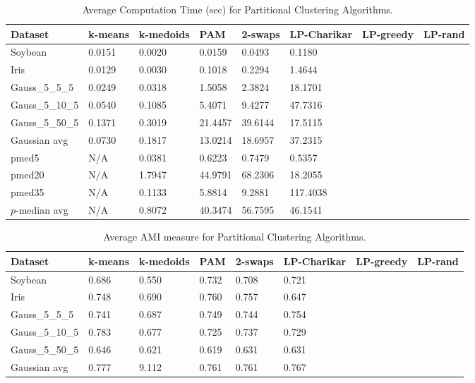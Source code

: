 \documentclass[conference, 10pt, final]{IEEEtran}
\begin{document}
\begin{table}[!t]
\label{fig:flat_results_comp}
\caption{Average Computation Time (sec) for Partitional Clustering Algorithms.}
\centering
\begin{tabular}{ | l | l | l | l | l | l | l | l|}
\hline
Dataset	&	k-means	&	k-medoids	&	PAM	&	2-swaps	&	LP-Charikar	&	LP-greedy	&	LP-rand	\\ \hline
Soybean	&	0.0151	&	0.0020	&	0.0159	&	0.0493	&	0.1180	&		&		\\
Iris	&	0.0129	&	0.0030	&	0.1018	&	0.2294	&	1.4644	&		&		\\
Gauss\_5\_5\_5	&	0.0249	&	0.0318	&	1.5058	&	2.3824	&	18.1701	&		&		\\
Gauss\_5\_10\_5	&	0.0540	&	0.1085	&	5.4071	&	9.4277	&	47.7316	&		&		\\
Gauss\_5\_50\_5	&	0.1371	&	0.3019	&	21.4457	&	39.6144	&	17.5115	&		&		\\
Gaussian avg	&	0.0730	&	0.1817	&	13.0214	&	18.6957	&	37.2315	&		&		\\
pmed5	&	N/A	&	0.0381	&	0.6223	&	0.7479	&	0.5357	&		&		\\
pmed20	&	N/A	&	1.7947	&	44.9791	&	68.2306	&	18.2055	&		&		\\
pmed35	&	N/A	&	0.1133	&	5.8814	&	9.2881	&	117.4038	&		&		\\
$p$-median avg	&	N/A	&	0.8072	&	40.3474	&	56.7595	&	46.1541	&		&		\\ \hline
\end{tabular}
\end{table}

\begin{table}[!t]
\label{fig:flat_results_AMI}
\caption{Average AMI measure for Partitional Clustering Algorithms.}
\centering
\begin{tabular}{ | l | l | l | l | l | l | l | l| }
\hline
Dataset	&	k-means	&	k-medoids	&	PAM	&	2-swaps	&	LP-Charikar	&	LP-greedy	&	LP-rand	\\ \hline
Soybean	&	0.686	&	0.550	&	0.732	&	0.708	&	0.721	&		&		\\
Iris	&	0.748	&	0.690	&	0.760	&	0.757	&	0.647	&		&		\\
Gauss\_5\_5\_5	&	0.741	&	0.687	&	0.749	&	0.744	&	0.754	&		&		\\
Gauss\_5\_10\_5	&	0.783	&	0.677	&	0.725	&	0.737	&	0.729	&		&		\\
Gauss\_5\_50\_5	&	0.646	&	0.621	&	0.619	&	0.631	&	0.631	&		&		\\
Gaussian avg	&	0.777	&	9.112	&	0.761	&	0.761	&	0.767	&		&		\\ \hline
\end{tabular}
\end{table}
\end{document}
